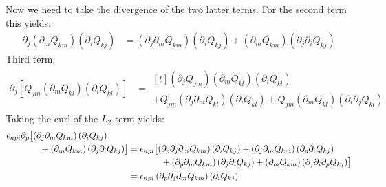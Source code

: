 \documentclass[reqno]{article}
\begin{document}
Now we need to take the divergence of the two latter terms. 
For the second term this yields:
\begin{equation}
\begin{split}
	\partial_j \left(\partial_m Q_{km} \right) \left( \partial_i Q_{kj} \right)
	&= \left( \partial_j \partial_m Q_{km} \right) \left( \partial_i Q_{kj} \right)
	+ \left( \partial_m Q_{km} \right) \left( \partial_j \partial_i Q_{kj} \right)
\end{split}
\end{equation}
Third term:
\begin{equation}
\begin{split}
	\partial_j \left[ Q_{jm} \left( \partial_m Q_{kl} \right) \left( \partial_i Q_{kl} \right) \right]
	&= 
	\begin{multlined}[t]
	\left( \partial_j Q_{jm} \right) \left( \partial_m Q_{kl} \right) \left( \partial_i Q_{kl} \right) \\
	+ Q_{jm} \left( \partial_j \partial_m Q_{kl} \right) \left( \partial_i Q_{kl} \right)
	+ Q_{jm} \left( \partial_m Q_{kl} \right) \left( \partial_i \partial_j Q_{kl} \right)
	\end{multlined}
\end{split}
\end{equation}
Taking the curl of the $L_2$ term yields:
\begin{equation}
\begin{split}
	\begin{multlined}[b]
	\epsilon_{npi} \partial_p \bigl[
	\left( \partial_j \partial_m Q_{km} \right) \left( \partial_i Q_{kj} \right) \\
	\hspace{1cm}+ \left( \partial_m Q_{km} \right) \left( \partial_j \partial_i Q_{kj} \right)
	\bigr]
	\end{multlined}
	&= 
	\begin{multlined}[t]
	\epsilon_{npi} \bigl[
	\left( \partial_p \partial_j \partial_m Q_{km} \right) \left( \partial_i Q_{kj} \right)
	+ \left( \partial_j \partial_m Q_{km} \right) \left( \partial_p \partial_i Q_{kj} \right) \\
	\hspace{0.5cm}+ \left( \partial_p \partial_m Q_{km} \right) \left( \partial_j \partial_i Q_{kj} \right)
	+ \left( \partial_m Q_{km} \right) \left( \partial_j \partial_i \partial_p Q_{kj} \right)
	\bigr]
	\end{multlined} \\
	&= \epsilon_{npi} \left( \partial_p \partial_j \partial_m Q_{km} \right) \left( \partial_i Q_{kj} \right)
\end{split}
\end{equation}
\end{document}
